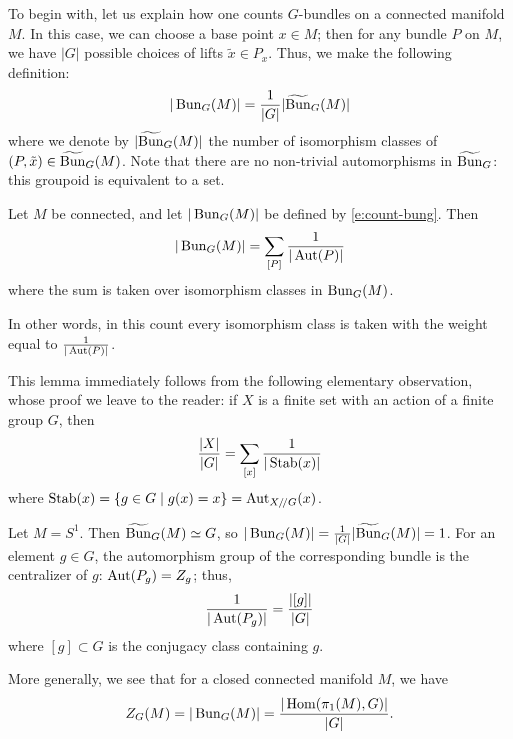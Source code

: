 To begin with, let us explain how one counts $G$-bundles on a connected
manifold $M$. In this case, we can choose a base point $x\in M$; then for any
bundle $P$ on $M$, we have $|G|$ possible choices of lifts $\tilde x\in P_x$.
Thus, we make the following definition:
\begin{equation}\label{e:count-bung}
  |\operatorname{Bun}_G(M)|=\frac{1}{|G|} |\widetilde{\operatorname{Bun}}_G(M)|
\end{equation}
where we denote by $|\widetilde{\operatorname{Bun}}_G(M)|$ the number of isomorphism classes of
$(P,\tilde x)\in \widetilde{\operatorname{Bun}}_G(M)$. Note that there are no non-trivial
automorphisms in $\widetilde{\operatorname{Bun}}_G$: this groupoid is equivalent to a set.

\begin{lemma}\label{l:count_aut}
  Let $M$ be connected, and let $|\operatorname{Bun}_G(M)|$ be defined by
  \eqref{e:count-bung}. Then
  $$
    |\operatorname{Bun}_G(M)|=\sum_{[P]} \frac{1}{|\operatorname{Aut}(P)|}
  $$
  where the sum is taken over isomorphism classes in $\operatorname{Bun}_G(M)$.
\end{lemma}
In other words, in this count every isomorphism class is taken with
the weight equal to $\frac{1}{|\operatorname{Aut}(P)|}$.

This lemma immediately follows from the following elementary observation,
whose proof we leave to the reader: if $X$ is a finite set with an action of a
finite group $G$, then
$$
  \frac{|X|}{|G|}=\sum_{[x]}\frac{1}{|\operatorname{Stab}(x)|}
$$
where $\operatorname{Stab}(x)=\{g\in G\; | \; g(x)=x\}=\operatorname{Aut}_{X/ \! / G}(x)$.
\begin{example}\label{x:bun-circle}
  Let $M=S^1$. Then $\widetilde{\operatorname{Bun}}_G(M)\simeq G$, so $|\operatorname{Bun}_G(M)|=\frac{1}{|G|}
  |\widetilde{\operatorname{Bun}}_G(M)|=1$.
  For an element $g\in G$, the automorphism group of the corresponding bundle
  is the centralizer of $g$: $\operatorname{Aut}(P_g)=Z_g$; thus,
  $$
  \frac{1}{|\operatorname{Aut}(P_g)|}= \frac{|[g]|}{|G|}
  $$
  where $[g]\subset G$ is the conjugacy class containing $g$.
\end{example}

More generally, we see that for a closed connected manifold $M$, we have
\begin{equation}\label{e:dw-closed}
  Z_G(M)= |\operatorname{Bun}_G(M)|= \frac{|\operatorname{Hom}(\pi_1(M), G)|}{|G|}.
\end{equation}


